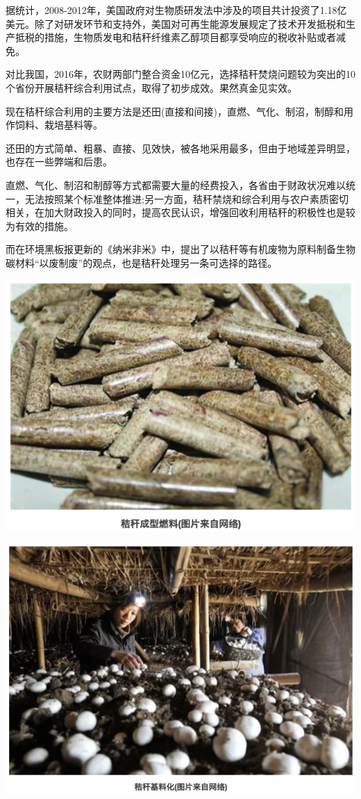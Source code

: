 \documentclass[]{book}
\begin{document}
据统计，2008-2012年，美国政府对生物质研发法中涉及的项目共计投资了1.18亿美元。除了对研发环节和支持外，美国对可再生能源发展规定了技术开发抵税和生产抵税的措施，生物质发电和秸秆纤维素乙醇项目都享受响应的税收补贴或者减免。

对比我国，2016年，农财两部门整合资金10亿元，选择秸秆焚烧问题较为突出的10个省份开展秸秆综合利用试点，取得了初步成效。果然真金见实效。

现在秸秆综合利用的主要方法是还田(直接和间接)，直燃、气化、制沼，制醇和用作饲料、栽培基料等。

还田的方式简单、粗暴、直接、见效快，被各地采用最多，但由于地域差异明显，也存在一些弊端和后患。

直燃、气化、制沼和制醇等方式都需要大量的经费投入，各省由于财政状况难以统一，无法按照某个标准整体推进;另一方面，秸秆禁烧和综合利用与农户素质密切相关，在加大财政投入的同时，提高农民认识，增强回收利用秸秆的积极性也是较为有效的措施。

而在环境黑板报更新的《纳米非米》中，提出了以秸秆等有机废物为原料制备生物碳材料``以废制废''的观点，也是秸秆处理另一条可选择的路径。

\includegraphics[width=8.33in]{images/stalk5}

\includegraphics[width=8.33in]{images/stalk6}
\end{document}
